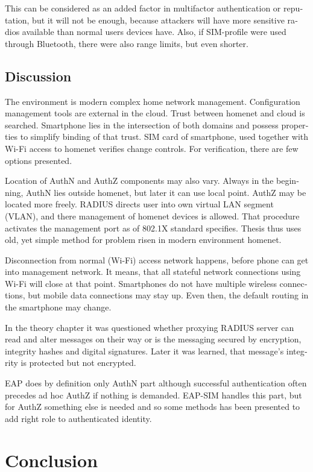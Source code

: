 \documentclass[12pt,a4paper,english]{tutthesis}
\begin{document}
\begin{otherlanguage}{english}
This can be considered as an added factor in multifactor
authentication or reputation, but it will not be enough, because
attackers will have more sensitive  radios available than normal users
devices have. 
Also, if SIM-profile were used through Bluetooth, there were also
range limits, but even shorter.


\section{Discussion}
\label{sec-6-10}

The environment is modern complex home network management.
Configuration management tools are 
external in the cloud. Trust between homenet and cloud is searched.
Smartphone lies in the intersection of both domains 
and possess properties to simplify binding of that trust.
SIM card of smartphone, used together with Wi-Fi access to homenet 
verifies change controls. For verification, there are few options presented.

Location of AuthN and AuthZ components may also vary.
Always in the beginning, AuthN lies outside homenet, but
later it can use local point. AuthZ may be located more freely.
RADIUS directs user into own virtual LAN segment (VLAN),
and there management of homenet devices is allowed.
That procedure activates the management port as of 802.1X standard
specifies.
Thesis thus uses old, yet simple method for problem risen in modern environment homenet.

Disconnection from normal (Wi-Fi) access network happens, before phone can get
into management network. It means, that all stateful network
connections using Wi-Fi will close at that point. Smartphones do not
have multiple wireless connections, but mobile data connections may 
stay up. Even then, the default routing in the smartphone may change.

In the theory chapter it was questioned whether proxying RADIUS server
can read and alter messages on their way or is the messaging secured
by encryption, integrity hashes and digital signatures.
Later it was learned, that message's integrity is protected but not encrypted.

EAP does by definition only AuthN part although successful
authentication often precedes ad hoc AuthZ if nothing is demanded.
EAP-SIM handles this part, but for AuthZ something else is needed
and so some methods has been presented to add right role to 
authenticated identity.


\chapter{Conclusion}
\label{sec-7}





\end{otherlanguage}
\end{document}

